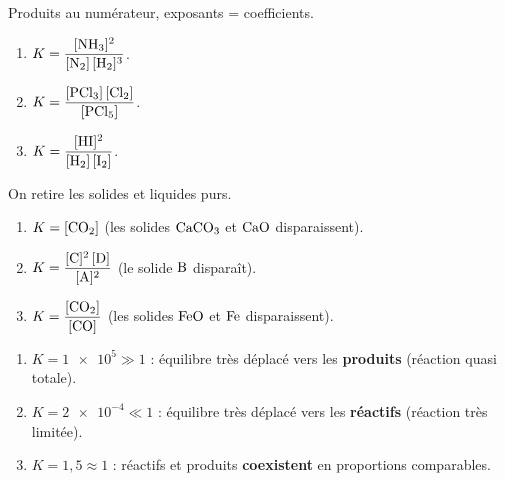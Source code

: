\documentclass[11pt,a4paper]{article}
\newcommand{\rep}[1]{\textcolor{primarydark}{\textbf{#1}}}
\begin{document}
\begin{center}
\end{center}

\begin{correction}
Produits au numérateur, exposants = coefficients.
\begin{enumerate}[label=\alph*),leftmargin=2em,topsep=2pt,itemsep=3pt]
  \item $K = \dfrac{[\ce{NH3}]^2}{[\ce{N2}]\,[\ce{H2}]^3}$.
  \item $K = \dfrac{[\ce{PCl3}]\,[\ce{Cl2}]}{[\ce{PCl5}]}$.
  \item $K = \dfrac{[\ce{HI}]^2}{[\ce{H2}]\,[\ce{I2}]}$.
\end{enumerate}
\end{correction}

\begin{correction}
On retire les solides et liquides purs.
\begin{enumerate}[label=\alph*),leftmargin=2em,topsep=2pt,itemsep=3pt]
  \item $K = [\ce{CO2}]$ \; (les solides $\ce{CaCO3}$ et $\ce{CaO}$ disparaissent).
  \item $K = \dfrac{[\ce{C}]^2\,[\ce{D}]}{[\ce{A}]^2}$ \; (le solide $\ce{B}$ disparaît).
  \item $K = \dfrac{[\ce{CO2}]}{[\ce{CO}]}$ \; (les solides $\ce{FeO}$ et $\ce{Fe}$ disparaissent).
\end{enumerate}
\end{correction}

\begin{correction}
\begin{enumerate}[label=\alph*),leftmargin=2em,topsep=2pt,itemsep=2pt]
  \item $K=\num{1e5}\gg1$ : équilibre très déplacé vers les \rep{produits} (réaction quasi totale).
  \item $K=\num{2e-4}\ll1$ : équilibre très déplacé vers les \rep{réactifs} (réaction très limitée).
  \item $K=1{,}5\approx1$ : réactifs et produits \rep{coexistent} en proportions comparables.
\end{enumerate}
\end{correction}
\end{document}
